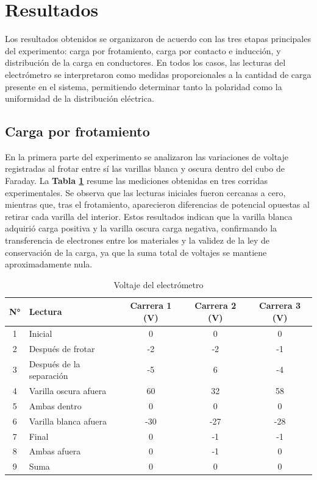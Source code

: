 \documentclass[12pt,a4paper]{article}
\begin{document}
\section{Resultados}

Los resultados obtenidos se organizaron de acuerdo con las tres etapas principales del experimento: carga por frotamiento, carga por contacto e inducción, y distribución de la carga en conductores. En todos los casos, las lecturas del electrómetro se interpretaron como medidas proporcionales a la cantidad de carga presente en el sistema, permitiendo determinar tanto la polaridad como la uniformidad de la distribución eléctrica.

\subsection{Carga por frotamiento}
En la primera parte del experimento se analizaron las variaciones de voltaje registradas al frotar entre sí las varillas blanca y oscura dentro del cubo de Faraday.  
La \textbf{Tabla \ref{tab:electrometro}} resume las mediciones obtenidas en tres corridas experimentales. Se observa que las lecturas iniciales fueron cercanas a cero, mientras que, tras el frotamiento, aparecieron diferencias de potencial opuestas al retirar cada varilla del interior.  
Estos resultados indican que la varilla blanca adquirió carga positiva y la varilla oscura carga negativa, confirmando la transferencia de electrones entre los materiales y la validez de la ley de conservación de la carga, ya que la suma total de voltajes se mantiene aproximadamente nula.

\begin{table}[H]
\centering
\caption{Voltaje del electrómetro}
\begin{tabular}{|c|l|c|c|c|}
\hline
\textbf{N°} & \textbf{Lectura} & \textbf{Carrera 1 (V)} & \textbf{Carrera 2 (V)} & \textbf{Carrera 3 (V)} \\ \hline
1 & Inicial & 0 & 0 & 0 \\ \hline
2 & Después de frotar & -2 & -2 & -1 \\ \hline
3 & Después de la separación & -5 & 6 & -4 \\ \hline
4 & Varilla oscura afuera & 60 & 32 & 58 \\ \hline
5 & Ambas dentro & 0 & 0 & 0 \\ \hline
6 & Varilla blanca afuera & -30 & -27 & -28 \\ \hline
7 & Final & 0 & -1 & -1 \\ \hline
8 & Ambas afuera & 0 & -1 & 0 \\ \hline
9 & Suma & 0 & 0 & 0 \\ \hline
\end{tabular}
\label{tab:electrometro}
\end{table}
\end{document}
